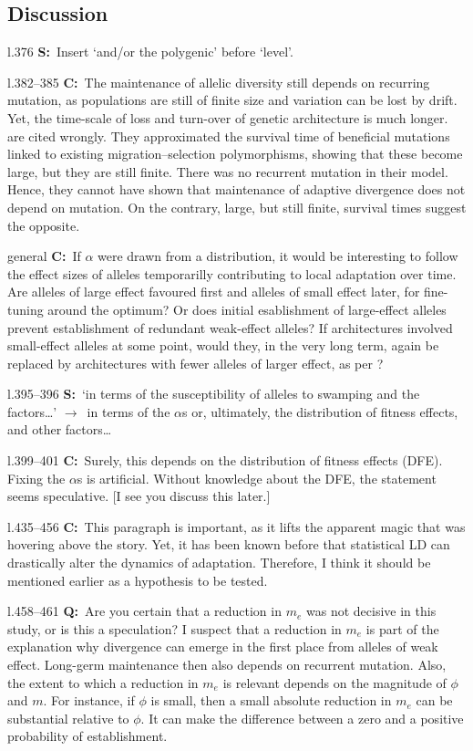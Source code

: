 \documentclass[11pt]{article}
\newenvironment{my_description}
{\begin{description}
  \setlength{\itemsep}{2pt}
  \setlength{\parskip}{0pt}
  \setlength{\parsep}{0pt}}
{\end{description}}
\newcommand{\ra}{$\rightarrow$\ }
\newcommand{\C}{\textbf{C:}\ }
\newcommand{\Q}{\textbf{Q:}\ }
\newcommand{\V}{\textbf{S:}\ }
\begin{document}
\subsection{Discussion}
\begin{my_description}
	\item[l.376] \V Insert `and/or the polygenic' before `level'.
	\item[l.382--385] \C The maintenance of allelic diversity still depends on recurring mutation, as populations are still of finite size and variation can be lost by drift. Yet, the time-scale of loss and turn-over of genetic architecture is much longer. \cite{Aeschbacher:2014fk} are cited wrongly. They approximated the survival time of beneficial mutations linked to existing migration--selection polymorphisms, showing that these become large, but they are still finite. There was no recurrent mutation in their model. Hence, they cannot have shown that maintenance of adaptive divergence does not depend on mutation. On the contrary, large, but still finite, survival times suggest the opposite.
	\item[general] \C If $\alpha$ were drawn from a distribution, it would be interesting to follow the effect sizes of alleles temporarilly contributing to local adaptation over time. Are alleles of large effect favoured first and alleles of small effect later, for fine-tuning around the optimum? Or does initial esablishment of large-effect alleles prevent establishment of redundant weak-effect alleles? If architectures involved small-effect alleles at some point, would they, in the very long term, again be replaced by architectures with fewer alleles of larger effect, as per \cite{Yeaman:2011fk}?
	\item[l.395--396] \V `in terms of the susceptibility of alleles to swamping and the factors\dots' \ra in terms of the $\alpha$s or, ultimately, the distribution of fitness effects, and other factors\dots
	\item[l.399--401] \C Surely, this depends on the distribution of fitness effects (DFE). Fixing the $\alpha$s is artificial. Without knowledge about the DFE, the statement seems speculative. [I see you discuss this later.]
	\item[l.435--456] \C This paragraph is important, as it lifts the apparent magic that was hovering above the story. Yet, it has been known before that statistical LD can drastically alter the dynamics of adaptation. Therefore, I think it should be mentioned earlier as a hypothesis to be tested.
	\item[l.458--461] \Q Are you certain that a reduction in $m_e$ was not decisive in this study, or is this a speculation? I suspect that a reduction in $m_e$ is part of the explanation why divergence can emerge in the first place from alleles of weak effect. Long-germ maintenance then also depends on recurrent mutation. Also, the extent to which a reduction in $m_e$ is relevant depends on the magnitude of $\phi$ and $m$. For instance, if $\phi$ is small, then a small absolute reduction in $m_e$ can be substantial relative to $\phi$. It can make the difference between a zero and a positive probability of establishment.

\end{my_description}
\end{document}
